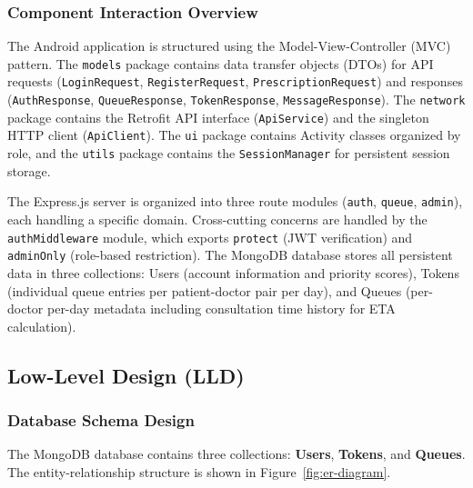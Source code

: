\documentclass[12pt,a4paper]{article}
\begin{document}
\subsubsection{Component Interaction Overview}

The Android application is structured using the Model-View-Controller (MVC) pattern. The \texttt{models} package contains data transfer objects (DTOs) for API requests (\texttt{LoginRequest}, \texttt{RegisterRequest}, \texttt{PrescriptionRequest}) and responses (\texttt{AuthResponse}, \texttt{QueueResponse}, \texttt{TokenResponse}, \texttt{MessageResponse}). The \texttt{network} package contains the Retrofit API interface (\texttt{ApiService}) and the singleton HTTP client (\texttt{ApiClient}). The \texttt{ui} package contains Activity classes organized by role, and the \texttt{utils} package contains the \texttt{SessionManager} for persistent session storage.

The Express.js server is organized into three route modules (\texttt{auth}, \texttt{queue}, \texttt{admin}), each handling a specific domain. Cross-cutting concerns are handled by the \texttt{authMiddleware} module, which exports \texttt{protect} (JWT verification) and \texttt{adminOnly} (role-based restriction). The MongoDB database stores all persistent data in three collections: Users (account information and priority scores), Tokens (individual queue entries per patient-doctor pair per day), and Queues (per-doctor per-day metadata including consultation time history for ETA calculation).

\subsection{Low-Level Design (LLD)}

\subsubsection{Database Schema Design}

The MongoDB database contains three collections: \textbf{Users}, \textbf{Tokens}, and \textbf{Queues}. The entity-relationship structure is shown in Figure~\ref{fig:er-diagram}.
\end{document}
